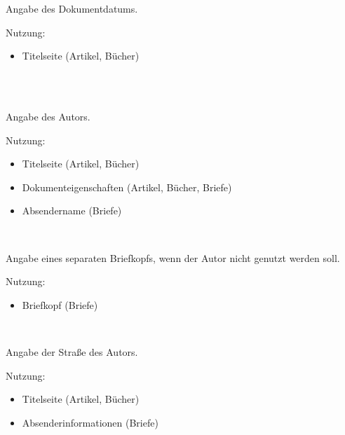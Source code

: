 \DescribeMacro{\date}
Angabe des Dokumentdatums.

Nutzung:
\begin{itemize}
	\item Titelseite (Artikel, Bücher)
\end{itemize}

\begin{nutzung}
		\>\\
	\beispiel
		\>\\
		\>
\end{nutzung}

\DescribeMacro{\author}
Angabe des Autors.

Nutzung:
\begin{itemize}
	\item Titelseite (Artikel, Bücher)
	\item Dokumenteigenschaften (Artikel, Bücher, Briefe)
	\item Absendername (Briefe)
\end{itemize}

\begin{nutzung}
		\>\\
	\beispiel
		\>
\end{nutzung}

\DescribeMacro{\briefkopf}
Angabe eines separaten Briefkopfs, wenn der Autor nicht genutzt werden soll.

Nutzung:
\begin{itemize}
	\item Briefkopf (Briefe)
\end{itemize}

\begin{nutzung}
		\>\\
	\beispiel
		\>
\end{nutzung}

\DescribeMacro{\strasse}
Angabe der Straße des Autors.

Nutzung:
\begin{itemize}
	\item Titelseite (Artikel, Bücher)
	\item Absenderinformationen (Briefe)
\end{itemize}

\begin{nutzung}
		\>\\
	\beispiel
		\>
\end{nutzung}

